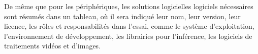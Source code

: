﻿\par De même que pour les périphériques, les solutions logicielles logiciels nécessaires sont résumés dans un tableau, où il sera indiqué leur nom, leur version, leur licence, les rôles et responsabilités dans l'essai, comme le système d'exploitation, l'environnement de développement, les librairies pour l'inférence, les logiciels de traitements vidéos et d'images.
